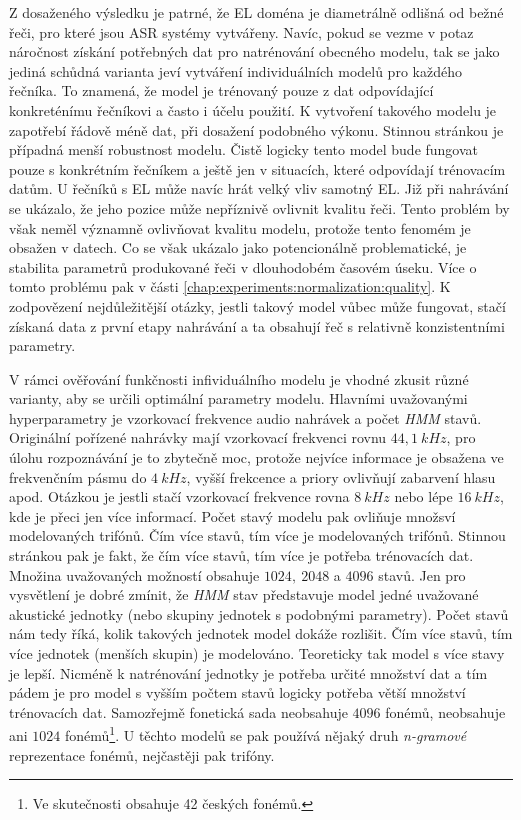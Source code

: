 Z dosaženého výsledku je patrné, že EL doména je diametrálně odlišná od bežné řeči, pro které jsou ASR systémy vytvářeny. Navíc, pokud se vezme v potaz náročnost získání potřebných dat pro natrénování obecného modelu, tak se jako jediná schůdná varianta jeví vytváření individuálních modelů pro každého řečníka. To znamená, že model je trénovaný pouze z dat odpovídající konkreténímu řečníkovi a často i účelu použití. K vytvoření takového modelu je zapotřebí řádově méně dat, při dosažení podobného výkonu. Stinnou stránkou je případná menší robustnost modelu. Čistě logicky tento model bude fungovat pouze s konkrétním řečníkem a ještě jen v situacích, které odpovídají trénovacím datům. U řečníků s EL může navíc hrát velký vliv samotný EL. Již při nahrávání se ukázalo, že jeho pozice může nepříznivě ovlivnit kvalitu řeči. Tento problém by však neměl významně ovlivňovat kvalitu modelu, protože tento fenomém je obsažen v datech. Co se však ukázalo jako potencionálně problematické, je stabilita parametrů produkované řeči v dlouhodobém časovém úseku. Více o tomto problému pak v části \ref{chap:experiments:normalization:quality}. K zodpovězení nejdůležitější otázky, jestli takový model vůbec může fungovat, stačí získaná data z první etapy nahrávání a ta obsahují řeč s relativně konzistentními parametry.

V rámci ověřování funkčnosti infividuálního modelu je vhodné zkusit různé varianty, aby se určili optimální parametry modelu. Hlavními uvažovanými hyperparametry je vzorkovací frekvence audio nahrávek a počet \textit{HMM} stavů. Originální pořízené nahrávky mají vzorkovací frekvenci rovnu $44,1\ kHz$, pro úlohu rozpoznávání je to zbytečně moc, protože nejvíce informace je obsažena ve frekvenčním pásmu do $4\ kHz$, vyšší frekcence a priory ovlivňují zabarvení hlasu apod. \cite{Psutka2006} Otázkou je jestli stačí vzorkovací frekvence rovna $8\ kHz$ nebo lépe $16\ kHz$, kde je přeci jen více informací. Počet stavý modelu pak ovliňuje množsví modelovaných trifónů. Čím více stavů, tím více je modelovaných trifónů. Stinnou stránkou pak je fakt, že čím více stavů, tím více  je potřeba trénovacích dat. Množina uvažovaných možností obsahuje $1024,\ 2048$ a $4096$ stavů. Jen pro vysvětlení je dobré zmínit, že \textit{HMM} stav představuje model jedné uvažované akustické jednotky (nebo skupiny jednotek s podobnými parametry). Počet stavů nám tedy říká, kolik takových jednotek model dokáže rozlišit. Čím více stavů, tím více jednotek (menších skupin) je modelováno. Teoreticky tak model s více stavy je lepší. Nicméně k natrénování jednotky je potřeba určité množství dat a tím pádem je pro model s vyšším počtem stavů logicky potřeba větší množství trénovacích dat. Samozřejmě fonetická sada neobsahuje $4096$ fonémů, neobsahuje ani $1024$ fonémů\footnote{Ve skutečnosti obsahuje 42 českých fonémů.}. U těchto modelů se pak používá nějaký druh \textit{n-gramové} reprezentace fonémů, nejčastěji pak trifóny.

